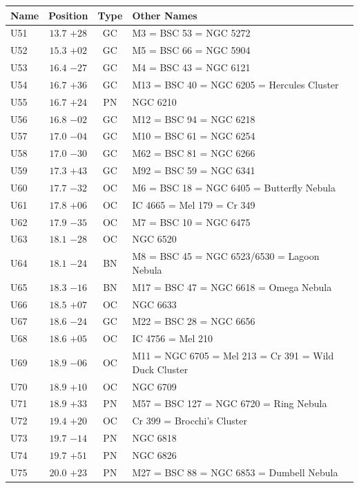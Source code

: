 \begin{table}[t]
    \setlength{\tabcolsep}{2pt}
    \footnotesize
    \begin{tabularx}{\linewidth}{lccX}
        \hline
        Name&Position&Type&Other Names\\
        \hline

U51  &$13.7$ $+28$&GC &M3 = BSC 53 = NGC 5272\\
U52  &$15.3$ $+02$&GC &M5 = BSC 66 = NGC 5904\\
U53  &$16.4$ $-27$&GC &M4 = BSC 43 = NGC 6121\\
U54  &$16.7$ $+36$&GC &M13 = BSC 40 = NGC 6205 = Hercules Cluster\\
U55  &$16.7$ $+24$&PN &NGC 6210\\
U56  &$16.8$ $-02$&GC &M12 = BSC 94 = NGC 6218\\
U57  &$17.0$ $-04$&GC &M10 = BSC 61 = NGC 6254\\
U58  &$17.0$ $-30$&GC &M62 = BSC 81 = NGC 6266\\
U59  &$17.3$ $+43$&GC &M92 = BSC 59 = NGC 6341\\
U60  &$17.7$ $-32$&OC &M6 = BSC 18 = NGC 6405 = Butterfly Nebula\\
U61  &$17.8$ $+06$&OC &IC 4665 = Mel 179 = Cr 349\\
U62  &$17.9$ $-35$&OC &M7 = BSC 10 = NGC 6475\\
U63  &$18.1$ $-28$&OC &NGC 6520\\
U64  &$18.1$ $-24$&BN &M8 = BSC 45 = NGC 6523/6530 = Lagoon Nebula\\
U65  &$18.3$ $-16$&BN &M17 = BSC 47 = NGC 6618 = Omega Nebula\\
U66  &$18.5$ $+07$&OC &NGC 6633\\
U67  &$18.6$ $-24$&GC &M22 = BSC 28 = NGC 6656\\
U68  &$18.6$ $+05$&OC &IC 4756 = Mel 210\\
U69  &$18.9$ $-06$&OC &M11 = NGC 6705 = Mel 213 = Cr 391 = Wild Duck Cluster\\
U70  &$18.9$ $+10$&OC &NGC 6709\\
U71  &$18.9$ $+33$&PN &M57 = BSC 127 = NGC 6720 = Ring Nebula\\
U72  &$19.4$ $+20$&OC &Cr 399 = Brocchi's Cluster\\
U73  &$19.7$ $-14$&PN &NGC 6818\\
U74  &$19.7$ $+51$&PN &NGC 6826\\
U75  &$20.0$ $+23$&PN &M27 = BSC 88 = NGC 6853 = Dumbell Nebula\\

\end{tabularx}
\end{table}
